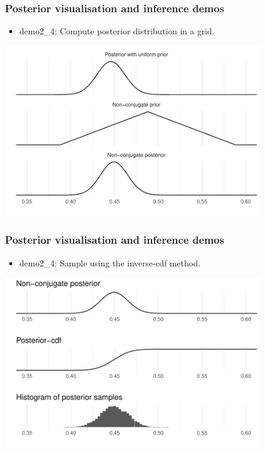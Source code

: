\documentclass[english,t]{beamer}
\begin{document}
\begin{frame}
  \frametitle{Posterior visualisation and inference demos}

  \begin{itemize}
  \item demo2\_4: Compute posterior distribution in a grid.
  \end{itemize}
  \includegraphics[width=11cm]{figs/demo2_4a.pdf}
\end{frame}

\begin{frame}
  \frametitle{Posterior visualisation and inference demos}

  \begin{itemize}
  \item demo2\_4: Sample using the inverse-cdf method.
  \end{itemize}
  \includegraphics[width=11cm]{figs/demo2_4b.pdf}
\end{frame}
\end{document}
